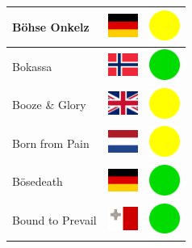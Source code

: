 \documentclass[12pt, a4paper, twoside]{report}
\begin{document}
\begin{center}
\begin{longtable}{|p{5cm}|p{2cm}|p{2cm}|}
			Böhse Onkelz & \includegraphics[width=1cm]{4x3/de} & \includegraphics[width=1cm]{likes/m} \\ \hline
			Bokassa & \includegraphics[width=1cm]{4x3/no} & \includegraphics[width=1cm]{likes/y} \\ \hline
			Booze \& Glory & \includegraphics[width=1cm]{4x3/gb} & \includegraphics[width=1cm]{likes/m} \\ \hline
			Born from Pain & \includegraphics[width=1cm]{4x3/nl} & \includegraphics[width=1cm]{likes/m} \\ \hline
			Bösedeath & \includegraphics[width=1cm]{4x3/de} & \includegraphics[width=1cm]{likes/y} \\ \hline
			Bound to Prevail & \includegraphics[width=1cm]{4x3/mt} & \includegraphics[width=1cm]{likes/y} \\ \hline

\end{longtable}
\end{center}
\end{document}
